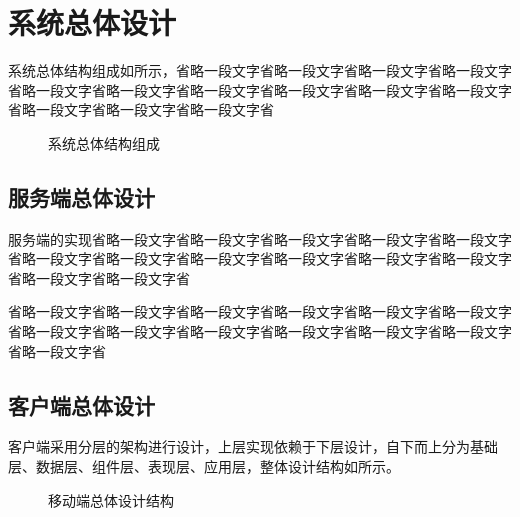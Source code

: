 \section{系统总体设计}

	系统总体结构组成如所示，省略一段文字省略一段文字省略一段文字省略一段文字省略一段文字省略一段文字省略一段文字省略一段文字省略一段文字省略一段文字省略一段文字省略一段文字省略一段文字省
		
	\begin{figure}[H]
		\centering
		\caption{系统总体结构组成}
		\label{overall_structure}
	\end{figure}
	
	\subsection{服务端总体设计}
	
		服务端的实现省略一段文字省略一段文字省略一段文字省略一段文字省略一段文字省略一段文字省略一段文字省略一段文字省略一段文字省略一段文字省略一段文字省略一段文字省略一段文字省		  
		  
		 省略一段文字省略一段文字省略一段文字省略一段文字省略一段文字省略一段文字省略一段文字省略一段文字省略一段文字省略一段文字省略一段文字省略一段文字省略一段文字省
		 
		  		  
		  
	\subsection{客户端总体设计}
		
		客户端采用分层的架构进行设计，上层实现依赖于下层设计，自下而上分为基础层、数据层、组件层、表现层、应用层，整体设计结构如所示。
	
	\begin{figure}[H]
		\centering
		\caption{移动端总体设计结构}
		\label{mobile_overall_design}
	\end{figure}


